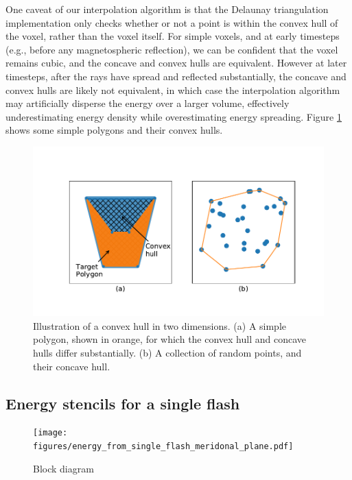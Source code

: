 One caveat of our interpolation algorithm is that the Delaunay triangulation implementation only checks whether or not a point is within the convex hull of the voxel, rather than the voxel itself. For simple voxels, and at early timesteps (e.g., before any magnetospheric reflection), we can be confident that the voxel remains cubic, and the concave and convex hulls are equivalent. However at later timesteps, after the rays have spread and reflected substantially, the concave and convex hulls are likely not equivalent, in which case the interpolation algorithm may artificially disperse the energy over a larger volume, effectively underestimating energy density while overestimating energy spreading. Figure \ref{fig:convex_hulls} shows some simple polygons and their convex hulls.


\begin{figure}
\begin{center}
\includegraphics{figures/convex_hulls.pdf}
\caption{Illustration of a convex hull in two dimensions. (a) A simple polygon, shown in orange, for which the convex hull and concave hulls differ substantially. (b) A collection of random points, and their concave hull.}
\label{fig:convex_hulls}
\end{center}
\end{figure}


\subsection{Energy stencils for a single flash}


\begin{figure}
\begin{center}
\texttt{[image: figures/energy\_from\_single\_flash\_meridonal\_plane.pdf]}
\caption{Block diagram}
\label{fig:energy_from_single_flash}
\end{center}
\end{figure}

